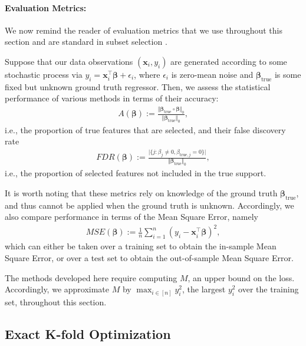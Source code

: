 \documentclass[mnsc,nonblindrev]{informs3} %
\begin{document}
{\color{black}\paragraph{Evaluation Metrics:} We now remind the reader of evaluation metrics that we use throughout this section and are standard in subset selection \citep[e.g.,][]{bertsimas2020sparse2, hastie2020best}. 

Suppose that our data observations $(\bm{x}_i, y_i)$ are generated according to some stochastic process via $y_i=\bm{x}_i^\top \bm{\beta}+\epsilon_i$, where $\epsilon_i$ is zero-mean noise and $\bm{\beta}_{\text{true}}$ is some fixed but unknown ground truth regressor. Then, we assess the statistical performance of various methods in terms of their accuracy:
\begin{align*}
    A(\bm{\beta}):=\frac{\Vert \bm{\beta}_{\text{true}} \circ \bm{\beta}\Vert_0}{\Vert \bm{\beta}_{\text{true}}\Vert_0},
\end{align*}
i.e., the proportion of true features that are selected, and their false discovery rate
\begin{align*}
    FDR(\bm{\beta}):=\frac{\vert \{j: \beta_j\neq 0, \beta_{\text{true},j}=0\}\vert}{\Vert \bm{\beta}_{\text{true}}\Vert_0},
\end{align*}
i.e., the proportion of selected features not included in the true support. 

It is worth noting that these metrics rely on knowledge of the ground truth $\bm{\beta}_{\text{true}}$, and thus cannot be applied when the ground truth is unknown. %
Accordingly, we also compare performance in terms of the Mean Square Error, namely
\begin{align*}
    MSE(\bm{\beta}):=\frac{1}{n}\sum_{i=1}^n (y_{i}-\bm{x}_{i}^\top \bm{\beta})^2,
\end{align*}
which can either be taken over a training set to obtain the in-sample Mean Square Error, or over a test set to obtain the out-of-sample Mean Square Error.

The methods developed here require computing $M$, an upper bound on the loss. Accordingly, we approximate $M$ by $\max_{i \in [n]} y_i^2$, the largest $y_i^2$ over the training set, throughout this section.
}



\subsection{Exact K-fold Optimization}\label{sec:compExactLOOCV}
\end{document}
